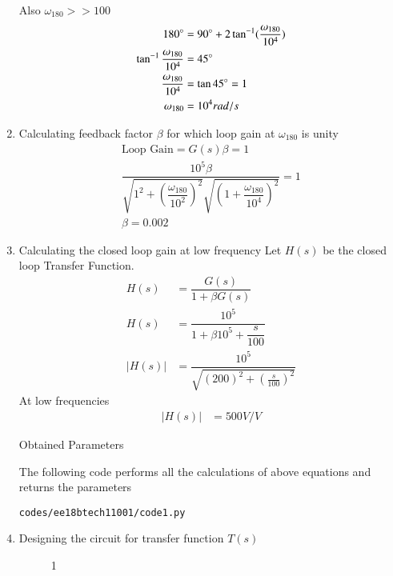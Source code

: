 \begin{enumerate}[label=\thesection.\arabic*.,ref=\thesection.\theenumi]
Also $\omega_{180} >> 100$
\begin{align}
180\degree &= 90\degree  + 2 \tan^{-1}(\frac{\omega_{180}}{10^{4}})
\\
\tan^{-1}\frac{\omega_{180}}{10^{4}}&= 45\degree
\\
\frac{\omega_{180}}{10^{4}} &= \tan 45\degree = 1
\\
\omega_{180} &= 10^{4} rad/s
\end{align}
\item Calculating feedback factor $\beta$ for which loop gain at $\omega_{180}$ is unity
\begin{align}
\text{Loop Gain} = G(s)\beta = 1
\\
\dfrac{10^{5}\beta}{\sqrt{1^{2} + (\dfrac{\omega_{180}}{10^{2}})^{2}} \sqrt{(1+\dfrac{\omega_{180}}{10^{4}})^{2}}} = 1
\\
\beta = 0.002
\end{align}
\item Calculating the closed loop gain at low frequency
Let $H(s)$ be the closed loop Transfer Function.
\begin{align}
H(s) &= \dfrac{G(s)}{1+\beta G(s)}
\\
H(s) &= \dfrac{10^{5}}{1+\beta 10^{5}+ \dfrac{s}{100}}
\\
|H(s)| &= \dfrac{10^{5}}{\sqrt{(200)^{2} + (\frac{s}{100})^{2}}}
\end{align}
At low frequencies
\begin{align}
|H(s)| &= 500 V/V
\end{align}

\begin{table}[!ht]
\centering

\caption{Obtained Parameters}
\label{table:ee18btech11001_params}
\end{table}

The following code performs all the calculations of above equations and returns the parameters 
\begin{lstlisting}
codes/ee18btech11001/code1.py
\end{lstlisting}

\item Designing the circuit for transfer function $T(s)$
\begin{figure}[!hbt]
	\begin{center}
			\resizebox{\columnwidth}{!}{}
	\end{center}
\caption{1}
\label{fig:equivalent_system}
\end{figure}


\end{enumerate}
